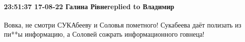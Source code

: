  
 
 
 
 

\paragraph{23:51:37 17-08-22 Галина Рівнеreplied to Владимир}

Вовка, не смотри СУКАбееву и Соловья пометного! Сукабеева даёт полизать из
пи**ы информацию, а Соловей сожрать информационного говнеца!
